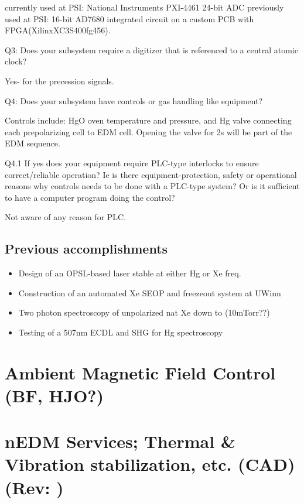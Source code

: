 \documentclass[11pt]{article}
\begin{document}
currently used at PSI: National Instruments PXI-4461 24-bit ADC
previously used at PSI: 16-bit AD7680 integrated circuit on a custom PCB with FPGA(XilinxXC3S400fg456).


Q3: Does your subsystem require a digitizer that is referenced to a central atomic clock?

Yes- for the precession signals.

Q4: Does your subsystem have controls or gas handling like equipment?

Controls include: HgO oven temperature and pressure, and Hg valve connecting each prepolarizing cell to EDM cell.  Opening the valve for 2s will be part of the EDM sequence.

Q4.1 If yes does your equipment require PLC-type interlocks to ensure correct/reliable operation?  Ie is there equipment-protection, safety or operational reasons why controls needs to be done with a PLC-type system? Or is it sufficient to have a computer program doing the control?

Not aware of any reason for PLC.

\subsection{Previous accomplishments}
\begin{itemize}
\item Design of an OPSL-based laser stable at either Hg or Xe freq.
\item Construction of an automated Xe SEOP and freezeout system at UWinn
\item Two photon spectroscopy of unpolarized nat Xe down to (10mTorr??)
\item Testing of a 507nm ECDL and SHG for Hg spectroscopy
\end{itemize}

\clearpage
\section{Ambient Magnetic Field Control  {\color{red}(BF, HJO?)}}


 \clearpage
\section{nEDM Services; Thermal \& Vibration stabilization, etc. {\color{red}(CAD)} {\color{darkgreen}(Rev: )}} 
\label{sec:services}

\end{document}
